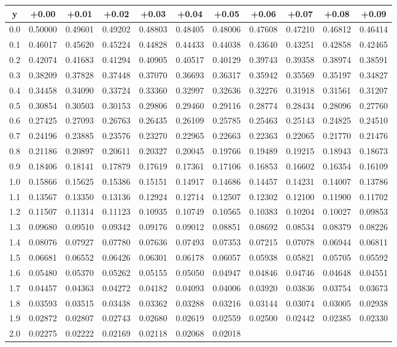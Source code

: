 \begin{longtable}[]{@{}ccccccccccc@{}}
\toprule
y & +0.00 & +0.01 & +0.02 & +0.03 & +0.04 & +0.05 & +0.06 & +0.07 &
+0.08 & +0.09\tabularnewline
\midrule
\endhead
0.0 & 0.50000 & 0.49601 & 0.49202 & 0.48803 & 0.48405 & 0.48006 &
0.47608 & 0.47210 & 0.46812 & 0.46414\tabularnewline
0.1 & 0.46017 & 0.45620 & 0.45224 & 0.44828 & 0.44433 & 0.44038 &
0.43640 & 0.43251 & 0.42858 & 0.42465\tabularnewline
0.2 & 0.42074 & 0.41683 & 0.41294 & 0.40905 & 0.40517 & 0.40129 &
0.39743 & 0.39358 & 0.38974 & 0.38591\tabularnewline
0.3 & 0.38209 & 0.37828 & 0.37448 & 0.37070 & 0.36693 & 0.36317 &
0.35942 & 0.35569 & 0.35197 & 0.34827\tabularnewline
0.4 & 0.34458 & 0.34090 & 0.33724 & 0.33360 & 0.32997 & 0.32636 &
0.32276 & 0.31918 & 0.31561 & 0.31207\tabularnewline
0.5 & 0.30854 & 0.30503 & 0.30153 & 0.29806 & 0.29460 & 0.29116 &
0.28774 & 0.28434 & 0.28096 & 0.27760\tabularnewline
0.6 & 0.27425 & 0.27093 & 0.26763 & 0.26435 & 0.26109 & 0.25785 &
0.25463 & 0.25143 & 0.24825 & 0.24510\tabularnewline
0.7 & 0.24196 & 0.23885 & 0.23576 & 0.23270 & 0.22965 & 0.22663 &
0.22363 & 0.22065 & 0.21770 & 0.21476\tabularnewline
0.8 & 0.21186 & 0.20897 & 0.20611 & 0.20327 & 0.20045 & 0.19766 &
0.19489 & 0.19215 & 0.18943 & 0.18673\tabularnewline
0.9 & 0.18406 & 0.18141 & 0.17879 & 0.17619 & 0.17361 & 0.17106 &
0.16853 & 0.16602 & 0.16354 & 0.16109\tabularnewline
1.0 & 0.15866 & 0.15625 & 0.15386 & 0.15151 & 0.14917 & 0.14686 &
0.14457 & 0.14231 & 0.14007 & 0.13786\tabularnewline
1.1 & 0.13567 & 0.13350 & 0.13136 & 0.12924 & 0.12714 & 0.12507 &
0.12302 & 0.12100 & 0.11900 & 0.11702\tabularnewline
1.2 & 0.11507 & 0.11314 & 0.11123 & 0.10935 & 0.10749 & 0.10565 &
0.10383 & 0.10204 & 0.10027 & 0.09853\tabularnewline
1.3 & 0.09680 & 0.09510 & 0.09342 & 0.09176 & 0.09012 & 0.08851 &
0.08692 & 0.08534 & 0.08379 & 0.08226\tabularnewline
1.4 & 0.08076 & 0.07927 & 0.07780 & 0.07636 & 0.07493 & 0.07353 &
0.07215 & 0.07078 & 0.06944 & 0.06811\tabularnewline
1.5 & 0.06681 & 0.06552 & 0.06426 & 0.06301 & 0.06178 & 0.06057 &
0.05938 & 0.05821 & 0.05705 & 0.05592\tabularnewline
1.6 & 0.05480 & 0.05370 & 0.05262 & 0.05155 & 0.05050 & 0.04947 &
0.04846 & 0.04746 & 0.04648 & 0.04551\tabularnewline
1.7 & 0.04457 & 0.04363 & 0.04272 & 0.04182 & 0.04093 & 0.04006 &
0.03920 & 0.03836 & 0.03754 & 0.03673\tabularnewline
1.8 & 0.03593 & 0.03515 & 0.03438 & 0.03362 & 0.03288 & 0.03216 &
0.03144 & 0.03074 & 0.03005 & 0.02938\tabularnewline
1.9 & 0.02872 & 0.02807 & 0.02743 & 0.02680 & 0.02619 & 0.02559 &
0.02500 & 0.02442 & 0.02385 & 0.02330\tabularnewline
2.0 & 0.02275 & 0.02222 & 0.02169 & 0.02118 & 0.02068 & 0.02018 &

\end{longtable}
